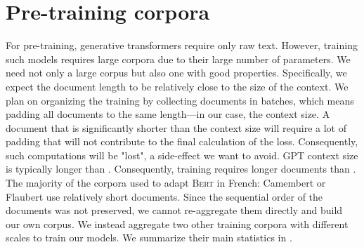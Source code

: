 
\section{Pre-training corpora}

For pre-training, generative transformers require only raw text. However, training such models requires large corpora due to their large number of parameters. We need not only a large corpus but also one with good properties. Specifically, we expect the document length to be relatively close to the size of the context. We plan on organizing the training by collecting documents in batches, which means padding all documents to the same length—in our case, the context size. A document that is significantly shorter than the context size will require a lot of padding that will not contribute to the final calculation of the loss. Consequently, such computations will be "lost", a side-effect we want to avoid. GPT context size is typically longer than \bert. Consequently, \gpt training requires longer documents than \bert. The majority of the corpora used to adapt \textsc{Bert} in French: Camembert \parencite{martin_20} or Flaubert \parencite{le_20b, le_20a} use relatively short documents. Since the sequential order of the documents was not preserved, we cannot re-aggregate them directly and build our own corpus. We instead aggregate two other training corpora with different scales to train our models. We summarize their main statistics in .

